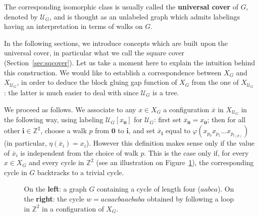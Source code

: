 \documentclass{article}
\begin{document}
The corresponding isomorphic class is usually called the \textbf{universal cover} of $G$, denoted by $\mathcal{U}_G$, and is thought as an unlabeled graph which admits labelings having an interpretation in terms of walks on $G$.\bigskip

In the following sections, we introduce concepts which are built upon the universal cover, in particular what we call the square cover (Section~\ref{sec:sqcover}). Let us take a moment here to explain the intuition behind this construction. We would like to establish a correspondence between $X_G$ and  $X_{\mathcal{U}_G}$, in order to deduce the block gluing gap function of $X_G$ from the one of $X_{\mathcal{U}_G}$: the latter is much easier to deal with since $\mathcal{U}_G$ is a tree.

We proceed as follows. We associate to any $x\in X_G$ a configuration $\overline{x}$ in $X_{\mathcal{U}_G}$ in the following way, using labeling $\mathcal{U}_G[x_{\textbf{0}}]$ for $\mathcal{U}_G$: first set $\overline{x}_{\textbf{0}} = x_{\textbf{0}}$; then for all other $\textbf{i}\in\mathbb Z^2$, choose a walk $p$ from $\textbf{0}$ to $\textbf{i}$, and set $\overline{x}_\textbf{i}$ equal to $\varphi(x_{p_0}x_{p_1}\dots x_{p_{l(p)}})$ (in particular, $\eta(\overline{x}_i) = x_i$).
However this definition makes sense only if the value of $\overline{x}_i$ is independent from the choice of walk $p$. This is the case only if, for every $x\in X_G$ and every cycle in $\mathbb Z^2$ (see an illustration on Figure~\ref{fig:funda}), the corresponding cycle in $G$ backtracks to a trivial cycle.

\begin{figure}[h!]
\begin{center}
\hspace{2cm}
\caption{On the \textbf{left}: a graph $G$ containing a cycle of length four ($aabca$). On the \textbf{right}: the cycle $w = acaacbaacbaba$ obtained by following 
a loop in $\mathbb Z^2$ in a configuration of $X_G$.
\label{fig:funda}}
\end{center}
\end{figure}
\end{document}
